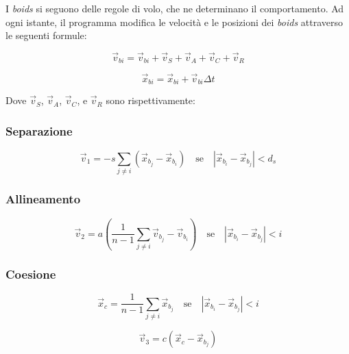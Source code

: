 \documentclass[10pt,a4paper]{article}
\begin{document}
I \textit{boids} si seguono delle regole di volo, che ne determinano il comportamento. Ad ogni istante, il programma modifica le velocità e le posizioni dei \textit{boids} attraverso le seguenti formule:

\begin{equation*}
    \vec{v}_{bi} = \vec{v}_{bi} + \vec{v}_S + \vec{v}_A + \vec{v}_C + \vec{v}_R
\end{equation*}

\begin{equation*}
    \vec{x}_{bi} = \vec{x}_{bi} + \vec{v}_{bi} \Delta t
\end{equation*}

Dove $\vec{v}_S$, $\vec{v}_A$, $\vec{v}_C$, e $\vec{v}_R$ sono rispettivamente:

\subsubsection{Separazione}

\begin{equation*}
    \vec{v}_1 = -s \sum_{j \neq i} (\vec{x}_{b_j} - \vec{x}_{b_i}) \quad \text{se} \quad \left| \vec{x}_{b_i} - \vec{x}_{b_j} \right| < d_s
\end{equation*}

\subsubsection{Allineamento}

\begin{equation*}
    \vec{v}_2 = a \left( \frac{1}{n-1} \sum_{j \neq i} \vec{v}_{b_j} - \vec{v}_{b_i} \right) \quad \text{se} \quad \left| \vec{x}_{b_i} - \vec{x}_{b_j} \right| < i
\end{equation*}

\subsubsection{Coesione}

\begin{equation*}
    \vec{x}_c = \frac{1}{n-1} \sum_{j \neq i} \vec{x}_{b_j} \quad \text{se} \quad \left| \vec{x}_{b_i} - \vec{x}_{b_j} \right| < i
\end{equation*}

\begin{equation*}
    \vec{v}_3 = c (\vec{x}_{c} - \vec{x}_{b_j})
\end{equation*}
\end{document}
